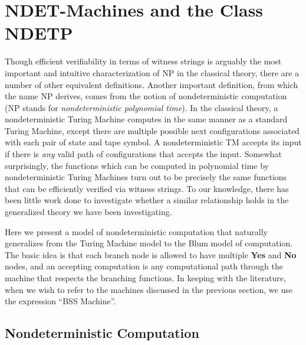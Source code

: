 \chapter{NDET-Machines and the Class NDETP}

Though efficient verifiability in terms of witness strings is arguably
the most important and intuitive characterization of NP in the
classical theory, there are a number of other equivalent definitions.
Another important definition, from which the name NP derives, comes
from the notion of nondeterministic computation (NP stands for
\emph{nondeterministic polynomial time}).  In the classical theory, a
nondeterministic Turing Machine computes in the same manner as a
standard Turing Machine, except there are multiple possible next
configurations associated with each pair of state and tape symbol.  A
nondeterministic TM accepts its input  if
there is \emph{any} valid path of configurations that accepts the
input.  Somewhat surprisingly, the functions which can be computed in
polynomial time by nondeterministic Turing Machines turn out to be
precisely the same functions that can be efficiently verified via
witness strings.  To our knowledge, there has been little work done to
investigate whether a similar relationship holds in the generalized
theory we have been investigating.

Here we present a model of nondeterministic computation that naturally
generalizes from the Turing Machine model to the Blum model of
computation.  The basic idea is that each branch node is allowed to
have multiple \textbf{Yes} and \textbf{No} nodes, and an accepting
computation is any computational path through the machine that
respects the branching functions.  In keeping with the literature,
when we wish to refer to the machines discussed in the previous
section, we use the expression ``BSS Machine''.

\section{Nondeterministic Computation}

